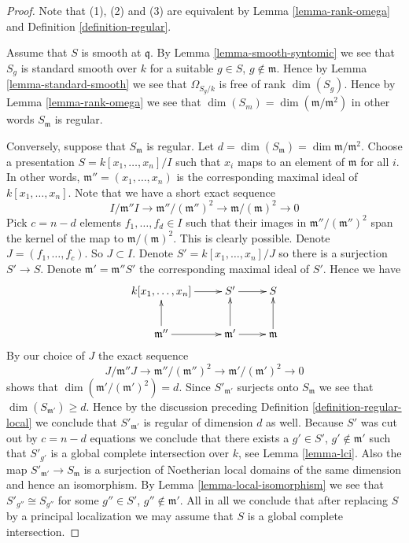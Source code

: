 \begin{proof}
Note that (1), (2) and (3) are equivalent by Lemma \ref{lemma-rank-omega}
and Definition \ref{definition-regular}.

\medskip\noindent
Assume that $S$ is smooth at $\mathfrak q$.
By Lemma \ref{lemma-smooth-syntomic} we see that
$S_g$ is standard smooth over $k$
for a suitable $g \in S$, $g \not \in \mathfrak m$.
Hence by Lemma \ref{lemma-standard-smooth}
we see that $\Omega_{S_g/k}$ is free of rank $\dim(S_g)$.
Hence by Lemma \ref{lemma-rank-omega}
we see that $\dim(S_m) = \dim (\mathfrak m/\mathfrak m^2)$
in other words $S_\mathfrak m$ is regular.

\medskip\noindent
Conversely, suppose that $S_{\mathfrak m}$ is regular.
Let $d = \dim(S_{\mathfrak m}) = \dim \mathfrak m/\mathfrak m^2$.
Choose a presentation $S = k[x_1, \ldots, x_n]/I$
such that $x_i$ maps to an element of $\mathfrak m$ for
all $i$. In other words, $\mathfrak m'' = (x_1, \ldots, x_n)$
is the corresponding maximal ideal of $k[x_1, \ldots, x_n]$.
Note that we have a short exact sequence
$$
I/\mathfrak m''I \to \mathfrak m''/(\mathfrak m'')^2
\to \mathfrak m/(\mathfrak m)^2 \to 0
$$
Pick $c = n - d$ elements $f_1, \ldots, f_d \in I$ such that
their images in $\mathfrak m''/(\mathfrak m'')^2$ span the
kernel of the map to $\mathfrak m/(\mathfrak m)^2$. This is clearly
possible. Denote $J = (f_1, \ldots, f_c)$. So $J \subset I$.
Denote $S' = k[x_1, \ldots, x_n]/J$ so there is a surjection
$S' \to S$. Denote $\mathfrak m' = \mathfrak m''S'$ the corresponding
maximal ideal of $S'$. Hence we have
$$
\xymatrix{
k[x_1, \ldots, x_n] \ar[r] & S' \ar[r] & S \\
\mathfrak m'' \ar[u] \ar[r] & \mathfrak m' \ar[r] \ar[u] &
\mathfrak m \ar[u]
}
$$
By our choice of $J$ the exact sequence
$$
J/\mathfrak m''J \to \mathfrak m''/(\mathfrak m'')^2
\to \mathfrak m'/(\mathfrak m')^2 \to 0
$$
shows that $\dim( \mathfrak m'/(\mathfrak m')^2 ) = d$.
Since $S'_{\mathfrak m'}$ surjects onto $S_{\mathfrak m}$
we see that $\dim(S_{\mathfrak m'}) \geq d$. Hence by
the discussion preceding Definition \ref{definition-regular-local}
we conclude that $S'_{\mathfrak m'}$ is
regular of dimension $d$ as well. Because $S'$ was cut out
by $c = n - d$ equations we
conclude that there exists a $g' \in S'$, $g' \not \in \mathfrak m'$
such that $S'_{g'}$ is a global complete intersection over $k$,
see Lemma \ref{lemma-lci}.
Also the map $S'_{\mathfrak m'} \to S_{\mathfrak m}$
is a surjection of Noetherian local domains of the same
dimension and hence an isomorphism. By Lemma \ref{lemma-local-isomorphism}
we see that $S'_{g''} \cong S_{g''}$ for some $g'' \in S'$,
$g'' \not \in \mathfrak m'$. All in all we conclude that
after replacing $S$ by a principal localization we may
assume that $S$ is a global complete intersection.


\end{proof}
